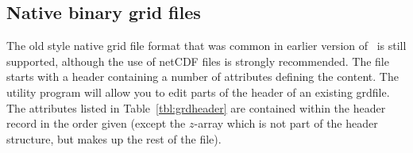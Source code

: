 \subsection{Native binary grid files}

The old style native grid file format that was common in earlier version of \GMT\ is still
supported, although the use of netCDF files is strongly recommended.
The file starts with a header containing a number of attributes defining the content.
The  utility program will allow you to edit parts of
the header of an existing grdfile.  The attributes listed in Table~\ref{tbl:grdheader}
are contained within the header record in the order given (except the $z$-array which
is not part of the header structure, but makes up the rest of the file).


